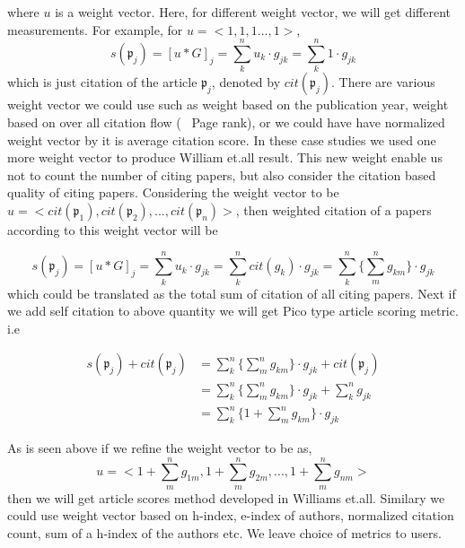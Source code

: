 \documentclass[review]{elsarticle}
\begin{document}
where $u$ is a weight vector. Here, for different weight vector, we will get different measurements.
For example, for  $u=<1,1,1...,1>$,
\begin{equation*}
s(\mathfrak{p}_j) = [u*G]_{j} = \sum_k^n  u_k \cdot g_{jk}=\sum_k^n  1\cdot g_{jk}
\end{equation*}
which is just citation of the article $\mathfrak{p}_j$, denoted by $cit(\mathfrak{p}_j)$. There are various weight vector we could use such as weight based on the publication year, weight based on over all citation flow (~ Page rank), or we could have have normalized weight vector by it is average citation score. In these case studies we used one more weight vector to produce William et.all result. This new weight enable us not to count the number of citing papers, but also consider the citation based quality of citing papers. Considering the weight vector to be $u=<cit(\mathfrak{p}_1),cit(\mathfrak{p}_2),...,cit(\mathfrak{p}_n)>$, then weighted citation of a papers according to this weight vector will be

\begin{equation*}
s(\mathfrak{p}_j) = [u*G]_{j} = \sum_k^n  u_k \cdot g_{jk}=\sum_k^n  cit(g_k)\cdot g_{jk} =\sum_k^n  \{\sum_m^n  g_{km}\} \cdot g_{jk}
\end{equation*}
which could be translated as the total sum of citation of all citing papers. Next if we add self citation to above quantity we will get Pico type article scoring metric. i.e

 
 \begin{equation}
 \begin{split}
s(\mathfrak{p}_j)+cit(\mathfrak{p}_j) & = \sum_k^n   \{\sum_m^n  g_{km}\} \cdot g_{jk} +cit(\mathfrak{p}_j)  \\
						       & =\sum_k^n   \{\sum_m^n  g_{km}\} \cdot g_{jk}+ \sum_k^n  g_{jk} \\
                                                          & =\sum_k^n   \{ 1+ \sum_m^n  g_{km} \} \cdot g_{jk}
\end{split}                                                          
\end{equation}

As is seen above if we refine the weight vector to be as, 
\begin{equation}\label{wu}
u = < 1+ \sum_m^n  g_{1m}  ,  1+  \sum_m^n  g_{2m} , ...,  1 +  \sum_m^n  g_{nm} >
\end{equation}
then  we will get article scores method developed in Williams et.all. Similary we could use weight vector based on h-index, e-index of authors, normalized citation count, sum of a h-index of the authors etc. We leave choice of metrics to users.
\end{document}
